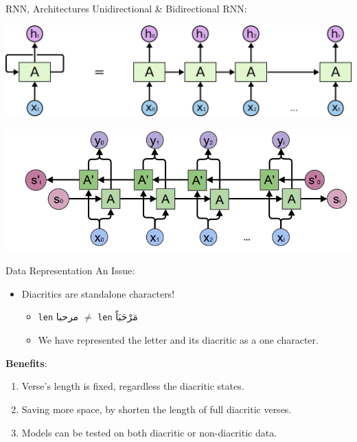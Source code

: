 \documentclass[10pt]{beamer}
\begin{document}
\begin{frame}[fragile]{RNN, Architectures}
Unidirectional \& Bidirectional RNN:
\begin{center}
\includegraphics[scale=0.3]{uni_rnn}
\end{center}

\begin{center}
\includegraphics[scale=0.3]{bi}
\end{center}
\end{frame}

\begin{frame}[fragile]{Data Representation}
An Issue:
\begin{itemize}
    \item Diacritics are standalone characters!
    \begin{itemize}
        \item \texttt{len} \textarabic{مرحبا} $\neq$ \texttt{len} \textarabic{مَرْحَبَاً}
        \item We have represented the letter and its diacritic as a \alert{one
character}.
    \end{itemize}
\end{itemize}
\textbf{Benefits}:
\begin{enumerate}
    \item Verse's length is fixed, regardless the diacritic states.
    \item Saving more space, by shorten the length of full diacritic verses. 
    \item Models can be tested on both diacritic or non-diacritic data.
\end{enumerate}
\end{frame}
\end{document}
